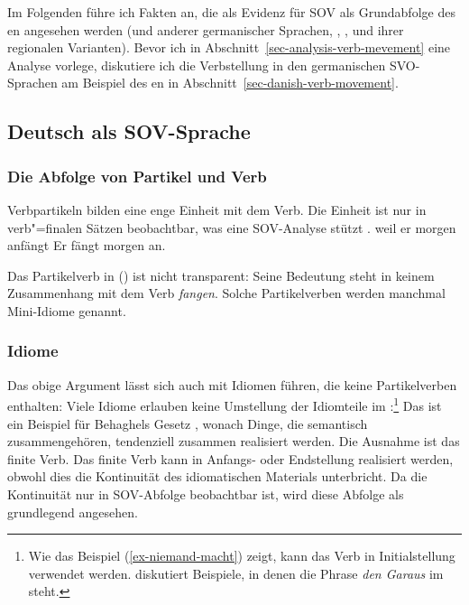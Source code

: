 Im Folgenden führe ich Fakten an, die als Evidenz für SOV als Grundabfolge des en angesehen werden
(und anderer germanischer Sprachen, \zb {}, ,  und ihrer regionalen
Varianten). Bevor ich in Abschnitt~\ref{sec-analysis-verb-mevement} eine Analyse vorlege, diskutiere ich die
Verbstellung in den germanischen SVO-Sprachen am Beispiel des en in Abschnitt~\ref{sec-danish-verb-movement}.

\subsection{Deutsch als SOV-Sprache}
\label{sec-German-as-SOV}

\subsubsection{Die Abfolge von Partikel und Verb}

Verbpartikeln bilden eine enge Einheit mit dem Verb. Die Einheit ist nur in verb"=finalen Sätzen beobachtbar,
was eine SOV-Analyse stützt \citep[]{Bierwisch63a}.
\eal
\ex 
weil er morgen anfängt
\ex 
Er fängt morgen an.
\zl

\noindent
Das Partikelverb in () ist nicht transparent: Seine Bedeutung steht in keinem Zusammenhang mit dem Verb
\emph{fangen}. Solche Partikelverben werden manchmal Mini-Idiome
genannt.

\subsubsection{Idiome}

Das obige Argument lässt sich auch mit Idiomen führen, die keine Partikelverben enthalten: Viele Idiome erlauben keine
Umstellung der Idiomteile im \mf:\footnote{
  Wie das Beispiel (\ref{ex-niemand-macht}) zeigt, kann das Verb in Initialstellung verwendet werden. \citet[]{MuellerLehrbuch3} diskutiert Beispiele, in denen die Phrase \emph{den Garaus} im \vf steht.
}
\eal
{}
\zl
Das ist ein Beispiel für Behaghels Gesetz \citeyearpar{Behaghel32-u},
wonach Dinge, die semantisch zusammengehören, tendenziell zusammen realisiert werden. Die Ausnahme ist das
finite Verb. Das finite Verb kann in Anfangs- oder Endstellung realisiert werden, obwohl dies
die Kontinuität des idiomatischen Materials unterbricht. Da die Kontinuität nur in SOV-Abfolge
beobachtbar ist, wird diese Abfolge als grundlegend angesehen.

